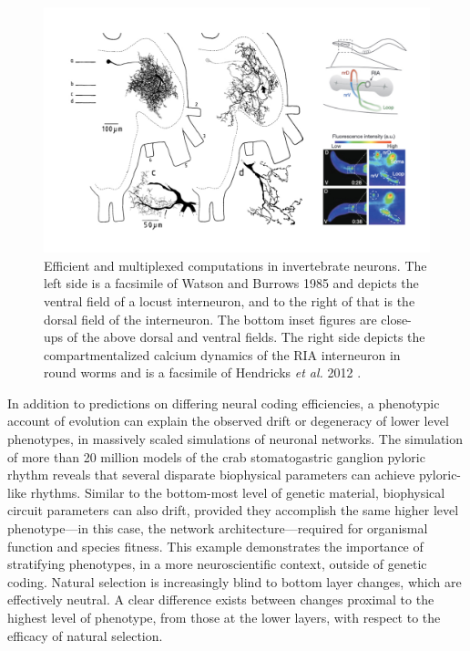 \documentclass{article}
\begin{document}
\begin{figure}[htp]
\centering
\includegraphics[width=13 cm]{fig_4.jpeg}
\caption{Efficient and multiplexed computations in invertebrate neurons. The left side is a facsimile of Watson and Burrows 1985 \cite{watson_burrows_1985} and depicts the ventral field of a locust interneuron, and to the right of that is the dorsal field of the interneuron. The bottom inset figures are close-ups of the above dorsal and ventral fields. The right side depicts the compartmentalized calcium dynamics of the RIA interneuron in round worms and is a facsimile of Hendricks \textit{et al.} 2012 \cite{Hendricks_Ha_Maffey_Zhang_2012}.}
\end{figure}

In addition to predictions on differing neural coding efficiencies, a phenotypic account of evolution can explain the observed drift or degeneracy of lower level phenotypes, in massively scaled simulations of neuronal networks. The simulation of more than 20 million models of the crab stomatogastric ganglion pyloric rhythm reveals that several disparate biophysical parameters can achieve pyloric-like rhythms. Similar to the bottom-most level of genetic material, biophysical circuit parameters can also drift, provided they accomplish the same higher level phenotype---in this case, the network architecture---required for organismal function and species fitness. This example demonstrates the importance of stratifying phenotypes, in a more neuroscientific context, outside of genetic coding. Natural selection is increasingly blind to bottom layer changes, which are effectively neutral. A clear difference exists between changes proximal to the highest level of phenotype, from those at the lower layers, with respect to the efficacy of natural selection. 
\end{document}
